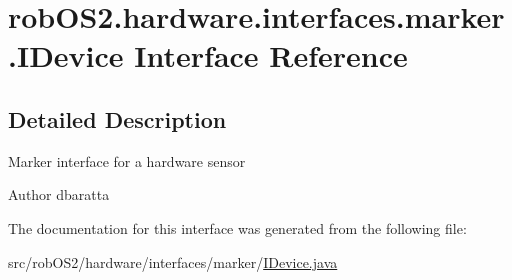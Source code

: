 \hypertarget{interfacerob_o_s2_1_1hardware_1_1interfaces_1_1marker_1_1_i_device}{
\section{robOS2.hardware.interfaces.marker.IDevice Interface Reference}
\label{interfacerob_o_s2_1_1hardware_1_1interfaces_1_1marker_1_1_i_device}
}


\subsection{Detailed Description}
Marker interface for a hardware sensor

\begin{DoxyAuthor}{Author}
dbaratta 
\end{DoxyAuthor}


The documentation for this interface was generated from the following file:\begin{DoxyCompactItemize}
\item 
src/robOS2/hardware/interfaces/marker/\hyperlink{_i_device_8java}{IDevice.java}\end{DoxyCompactItemize}
